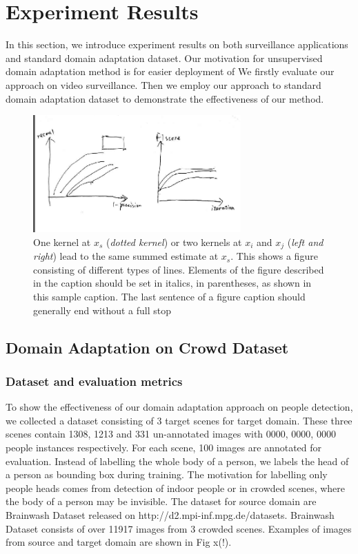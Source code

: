 \documentclass[runningheads]{llncs}
\begin{document}
\section{Experiment Results}

In this section, we introduce experiment results on both surveillance applications and standard domain adaptation dataset. Our motivation for unsupervised domain adaptation method is for easier deployment of  We firstly evaluate our approach on video surveillance. Then we employ our approach to standard domain adaptation dataset to demonstrate the effectiveness of our method.

\begin{figure}
\centering
\includegraphics[height=4.5cm]{images/precisionrecall.png}
\caption{One kernel at $x_s$ ({\it dotted kernel}) or two kernels at
$x_i$ and $x_j$ ({\it left and right}) lead to the same summed estimate
at $x_s$. This shows a figure consisting of different types of
lines. Elements of the figure described in the caption should be set in
italics,
in parentheses, as shown in this sample caption. The last
sentence of a figure caption should generally end without a full stop}
\label{fig:example}
\end{figure}

\subsection{Domain Adaptation on Crowd Dataset}

\subsubsection{Dataset and evaluation metrics}
To show the effectiveness of our domain adaptation approach on people detection, we collected a dataset consisting of 3 target scenes for target domain. These three scenes contain 1308, 1213 and 331 un-annotated images with 0000, 0000, 0000 people instances respectively. For each scene, 100 images are annotated for evaluation. Instead of labelling the whole body of a person, we labels the head of a person as bounding box during training. The motivation for labelling only people heads comes from detection of indoor people or in crowded scenes, where the body of a person may be invisible. The dataset for source domain are Brainwash Dataset released on http://d2.mpi-inf.mpg.de/datasets. Brainwash Dataset consists of over 11917 images from 3 crowded scenes. Examples of images from source and target domain are shown in Fig x(!).
\end{document}
